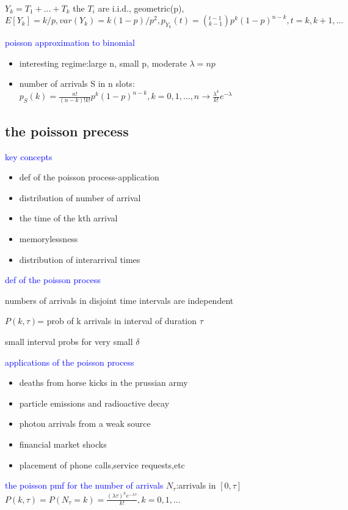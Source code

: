 $Y_k=T_1+...+T_k$ the $T_i$ are i.i.d., geometric(p),$E[Y_k]=k/p,var(Y_k)=k(1-p)/p^2,p_{Y_k}(t)=(^{t-1}_{k-1})p^k(1-p)^{n-k},t=k,k+1,...$


\textcolor{blue}{poisson approximation to binomial}

\begin{itemize}
    \item interesting regime:large n, small p, moderate $\lambda=np$
    \item number of arrivals S in n slots:$p_S(k)=\frac{n!}{(n-k)!k!}p^k(1-p)^{n-k},k=0,1,...,n\to \frac{\lambda^k}{k!}e^{-\lambda}$
\end{itemize}

\subsection{the poisson precess}
\textcolor{blue}{key concepts}
\begin{itemize}
    \item def of the poisson process-application
    \item distribution of number of arrival
    \item the time of the kth arrival
    \item memorylessness
    \item distribution of interarrival times
\end{itemize}


\textcolor{blue}{def of the poisson process}

numbers of arrivals in disjoint time intervals are independent

$P(k,\tau)$= prob of k arrivals in interval of duration $\tau$


small interval probs for very small $\delta$


\textcolor{blue}{applications of the poisson process}

\begin{itemize}
    \item deaths from horse kicks in the prussian army
    \item particle emissions and radioactive decay
    \item photon arrivals from a weak source
    \item financial market shocks
    \item placement of phone calls,service requests,etc
\end{itemize}


\textcolor{blue}{the poisson pmf for the number of arrivals}
$N_\tau$:arrivals in $[0,\tau]$ $P(k,\tau)=P(N_\tau=k)=\frac{(\lambda \tau)^ke^{-\lambda \tau}}{k!},k=0,1,...$

